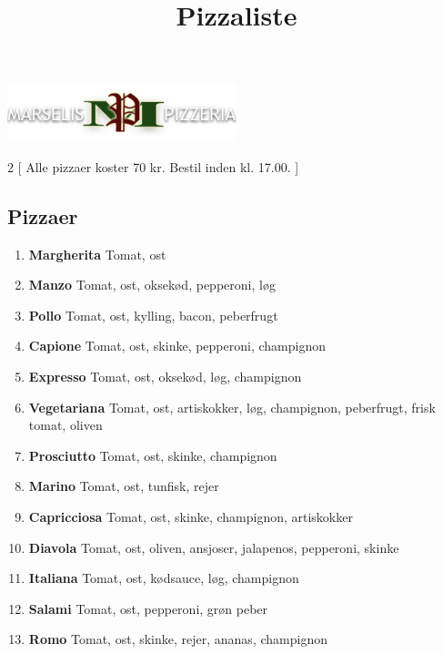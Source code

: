 \documentclass[danish,a4paper]{article}
\title{Pizzaliste}
\date{\vspace{-10ex}}
\author{\vspace{-10ex}}
\begin{document}

\maketitle

\begin{center}
    \includegraphics[width=0.5\textwidth]{logo.png}
\end{center}

\begin{multicols}{2}
[
\noindent Alle pizzaer koster 70 kr. Bestil inden kl. 17.00.
]
\subsection*{Pizzaer}
\begin{enumerate}[label={\large\textbf{\arabic*}.}]
    \setcounter{enumi}{0}
    \item \textbf{\textcolor{vegigreen}{Margherita}} Tomat, ost
    \item \textbf{Manzo} Tomat, ost, oksekød, pepperoni, løg
    \item \textbf{Pollo} Tomat, ost, kylling, bacon, peberfrugt 
    \item \textbf{Capione} Tomat, ost, skinke, pepperoni, champignon
    \item \textbf{Expresso} Tomat, ost, oksekød, løg, champignon 
    \item \textbf{\textcolor{vegigreen}{Vegetariana}} Tomat, ost, artiskokker, løg, champignon, peberfrugt, frisk tomat, oliven
    \item \textbf{Prosciutto} Tomat, ost, skinke, champignon 
    \item \textbf{Marino} Tomat, ost, tunfisk, rejer
    \item \textbf{Capricciosa} Tomat, ost, skinke, champignon, artiskokker
    \item \textbf{Diavola} Tomat, ost, oliven, ansjoser, jalapenos, pepperoni, skinke
    \item \textbf{Italiana} Tomat, ost, kødsauce, løg, champignon 
    \item \textbf{Salami} Tomat, ost, pepperoni, grøn peber
    \item \textbf{Romo} Tomat, ost, skinke, rejer, ananas, champignon

\end{enumerate}
\end{multicols}
\end{document}
